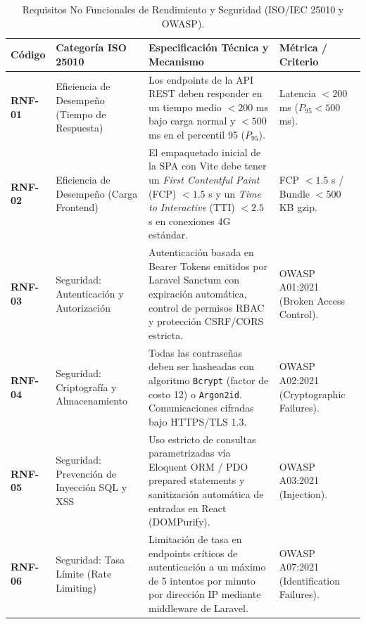 \begin{table}[H]
\centering
\small
\begin{tabularx}{\linewidth}{l>{\raggedright\arraybackslash}p{3.2cm}>{\raggedright\arraybackslash}X>{\raggedright\arraybackslash}p{2.8cm}}
\toprule
\rowcolor{LightSlate}
\textbf{Código} & \textbf{Categoría ISO 25010} & \textbf{Especificación Técnica y Mecanismo} & \textbf{Métrica / Criterio} \\
\midrule
\textbf{RNF-01} & Eficiencia de Desempeño (Tiempo de Respuesta) & Los endpoints de la API REST deben responder en un tiempo medio $<200$ ms bajo carga normal y $<500$ ms en el percentil 95 ($P_{95}$). & Latencia $< 200$ ms ($P_{95} < 500$ ms). \\
\midrule
\textbf{RNF-02} & Eficiencia de Desempeño (Carga Frontend) & El empaquetado inicial de la SPA con Vite debe tener un \textit{First Contentful Paint} (FCP) $<1.5$ s y un \textit{Time to Interactive} (TTI) $<2.5$ s en conexiones 4G estándar. & FCP $< 1.5$ s / Bundle $< 500$ KB gzip. \\
\midrule
\textbf{RNF-03} & Seguridad: Autenticación y Autorización & Autenticación basada en Bearer Tokens emitidos por Laravel Sanctum con expiración automática, control de permisos RBAC y protección CSRF/CORS estricta. & OWASP A01:2021 (Broken Access Control). \\
\midrule
\textbf{RNF-04} & Seguridad: Criptografía y Almacenamiento & Todas las contraseñas deben ser hasheadas con algoritmo \texttt{Bcrypt} (factor de costo 12) o \texttt{Argon2id}. Comunicaciones cifradas bajo HTTPS/TLS 1.3. & OWASP A02:2021 (Cryptographic Failures). \\
\midrule
\textbf{RNF-05} & Seguridad: Prevención de Inyección SQL y XSS & Uso estricto de consultas parametrizadas vía Eloquent ORM / PDO prepared statements y sanitización automática de entradas en React (DOMPurify). & OWASP A03:2021 (Injection). \\
\midrule
\textbf{RNF-06} & Seguridad: Tasa Límite (Rate Limiting) & Limitación de tasa en endpoints críticos de autenticación a un máximo de 5 intentos por minuto por dirección IP mediante middleware de Laravel. & OWASP A07:2021 (Identification Failures). \\
\bottomrule
\end{tabularx}
\caption{Requisitos No Funcionales de Rendimiento y Seguridad (ISO/IEC 25010 y OWASP).}
\label{tab:rnf_parte1}
\end{table}

